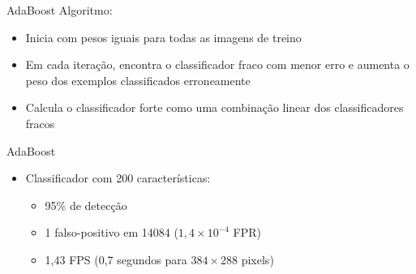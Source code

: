 \begin{frame}{AdaBoost}
Algoritmo:
\medskip
\begin{itemize}
    \item Inicia com pesos iguais para todas as imagens de treino
    \item Em cada iteração, encontra o classificador fraco com menor erro e aumenta o peso dos exemplos classificados erroneamente
    \item Calcula o classificador forte como uma combinação linear dos classificadores fracos
\end{itemize}
\end{frame}


\begin{frame}{AdaBoost}
\begin{itemize}
    \item Classificador com 200 características:
        \begin{itemize}
            \item 95\% de detecção
            \item 1 falso-positivo em 14084 ($1,4\times10^{-4}$ FPR)
            \item 1,43 FPS (0,7 segundos para $384\times288$ pixels)
        \end{itemize}
\end{itemize}

\begin{center}
\end{center}

\end{frame}


